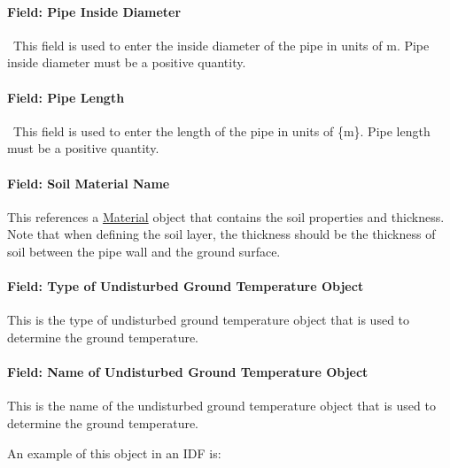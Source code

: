 \paragraph{Field: Pipe Inside Diameter}\label{field-pipe-inside-diameter-2}

~This field is used to enter the inside diameter of the pipe in units of m. Pipe inside diameter must be a positive quantity.

\paragraph{Field: Pipe Length}\label{field-pipe-length-2}

~This field is used to enter the length of the pipe in units of \{m\}. Pipe length must be a positive quantity.

\paragraph{Field: Soil Material Name}\label{field-soil-material-name}

This references a \hyperref[material]{Material} object that contains the soil properties and thickness.~ Note that when defining the soil layer, the thickness should be the thickness of soil between the pipe wall and the ground surface.

\paragraph{Field: Type of Undisturbed Ground Temperature Object}\label{field-type-of-undisturbed-ground-temperature-object-001}

This is the type of undisturbed ground temperature object that is used to determine the ground temperature.

\paragraph{Field: Name of Undisturbed Ground Temperature Object}\label{field-name-of-undisturbed-ground-temperature-object-001}

This is the name of the undisturbed ground temperature object that is used to determine the ground temperature.

An example of this object in an IDF is:

